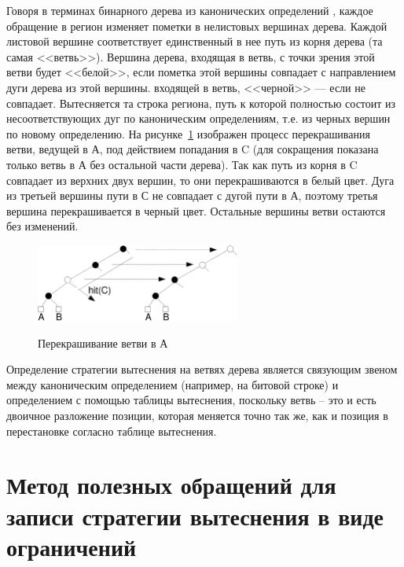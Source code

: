 Говоря в терминах бинарного дерева из канонических определений \PseudoLRU, каждое обращение в регион изменяет пометки в нелистовых вершинах дерева. Каждой листовой вершине соответствует единственный в нее путь из корня дерева (та самая <<ветвь>>). Вершина дерева, входящая в ветвь, с точки зрения этой ветви будет <<белой>>, если пометка этой вершины совпадает с направлением дуги дерева из этой вершины. входящей в ветвь, <<черной>> --- если не совпадает. Вытесняется та строка региона, путь к которой полностью состоит из несоответствующих дуг по каноническим определениям, т.е. из черных вершин по новому определению. На рисунке~\ref{recolor}
изображен процесс перекрашивания ветви, ведущей в А, под действием
попадания в C (для сокращения показана только ветвь в А без
остальной части дерева). Так как путь из корня в C совпадает из
верхних двух вершин, то они перекрашиваются в белый цвет. Дуга из
третьей вершины пути в С не совпадает с дугой пути в А, поэтому
третья вершина перекрашивается в черный цвет. Остальные вершины
ветви остаются без изменений.

\begin{figure}[h] \center
  \includegraphics[width=0.6\textwidth]{1.review/recolor}\\
  \caption{Перекрашивание ветви в А}\label{recolor}
\end{figure}


Определение стратегии вытеснения \PseudoLRU на ветвях дерева
является связующим звеном между каноническим определением (например,
на битовой строке) и определением с помощью таблицы вытеснения,
поскольку ветвь -- это и есть двоичное разложение позиции, которая меняется точно так же, как и позиция в перестановке согласно таблице вытеснения.



\section{Метод полезных обращений для записи стратегии вытеснения в виде ограничений}\label{sec:usefulness_functions}


